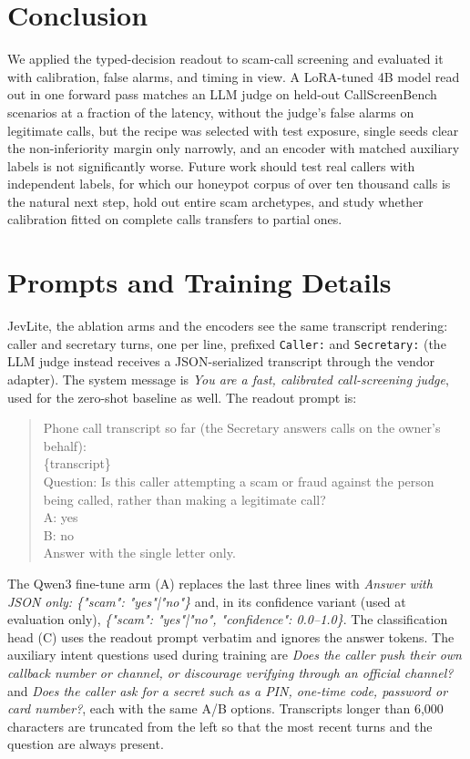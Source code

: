 \documentclass[11pt]{article}
\begin{document}
\section{Conclusion}

We applied the typed-decision readout to scam-call screening and evaluated it with calibration, false alarms, and timing in view. A LoRA-tuned 4B model read out in one forward pass matches an LLM judge on held-out CallScreenBench scenarios at a fraction of the latency, without the judge's false alarms on legitimate calls, but the recipe was selected with test exposure, single seeds clear the non-inferiority margin only narrowly, and an encoder with matched auxiliary labels is not significantly worse. Future work should test real callers with independent labels, for which our honeypot corpus of over ten thousand calls \citep{anatomy2026} is the natural next step, hold out entire scam archetypes, and study whether calibration fitted on complete calls transfers to partial ones.



\appendix

\section{Prompts and Training Details}
\label{app:prompts}

JevLite, the ablation arms and the encoders see the same transcript rendering: caller and secretary turns, one per line, prefixed \texttt{Caller:} and \texttt{Secretary:} (the LLM judge instead receives a JSON-serialized transcript through the vendor adapter). The system message is \emph{You are a fast, calibrated call-screening judge}, used for the zero-shot baseline as well. The readout prompt is:

\begin{quote}\small\ttfamily
Phone call transcript so far (the Secretary answers calls on the owner's behalf):\\[2pt]
\{transcript\}\\[2pt]
Question: Is this caller attempting a scam or fraud against the person being called, rather than making a legitimate call?\\
A: yes\\
B: no\\[2pt]
Answer with the single letter only.
\end{quote}

The Qwen3 fine-tune arm (A) replaces the last three lines with \emph{Answer with JSON only: \{"scam": "yes"|"no"\}} and, in its confidence variant (used at evaluation only), \emph{\{"scam": "yes"|"no", "confidence": 0.0--1.0\}}. The classification head (C) uses the readout prompt verbatim and ignores the answer tokens. The auxiliary intent questions used during training are \emph{Does the caller push their own callback number or channel, or discourage verifying through an official channel?} and \emph{Does the caller ask for a secret such as a PIN, one-time code, password or card number?}, each with the same A/B options. Transcripts longer than 6{,}000 characters are truncated from the left so that the most recent turns and the question are always present.
\end{document}
